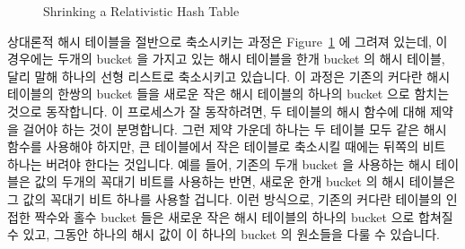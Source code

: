 \begin{figure}[tb]
\centering
{}
\caption{Shrinking a Relativistic Hash Table}
\label{fig:datastruct:Shrinking a Relativistic Hash Table}
\end{figure}

상대론적 해시 테이블을 절반으로 축소시키는 과정은
Figure~\ref{fig:datastruct:Shrinking a Relativistic Hash Table} 에 그려져
있는데, 이 경우에는 두개의 bucket 을 가지고 있는 해시 테이블을 한개 bucket 의
해시 테이블, 달리 말해 하나의 선형 리스트로 축소시키고 있습니다.
이 과정은 기존의 커다란 해시 테이블의 한쌍의 bucket 들을 새로운 작은 해시
테이블의 하나의 bucket 으로 함치는 것으로 동작합니다.
이 프로세스가 잘 동작하려면, 두 테이블의 해시 함수에 대해 제약을 걸어야 하는
것이 분명합니다.
그런 제약 가운데 하나는 두 테이블 모두 같은 해시 함수를 사용해야 하지만, 큰
테이블에서 작은 테이블로 축소시킬 때에는 뒤쪽의 비트 하나는 버려야 한다는
것입니다.
예를 들어, 기존의 두개 bucket 을 사용하는 해시 테이블은 값의 두개의 꼭대기
비트를 사용하는 반면, 새로운 한개 bucket 의 해시 테이블은 그 값의 꼭대기 비트
하나를 사용할 겁니다.
이런 방식으로, 기존의 커다란 테이블의 인접한 짝수와 홀수 bucket 들은 새로운
작은 해시 테이블의 하나의 bucket 으로 합쳐질 수 있고, 그동안 하나의 해시 값이
이 하나의 bucket 의 원소들을 다룰 수 있습니다.
\iffalse

